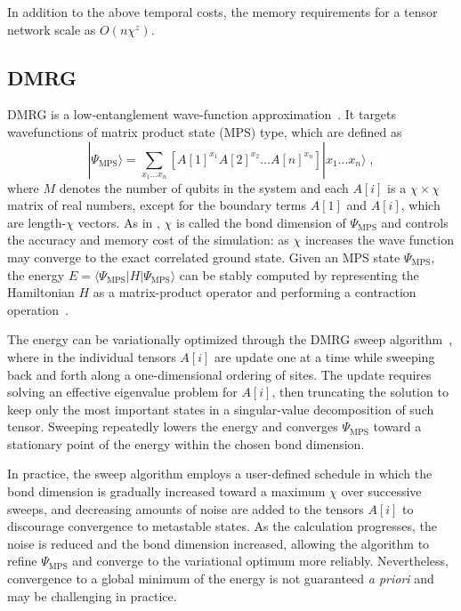 \documentclass[
  reprint,            %
  amsmath,amssymb,
  aps,
  superscriptaddress, %
  longbibliography
]{revtex4-2}
\theoremstyle{definition}
\begin{document}
In addition to the above temporal costs, the memory requirements for a tensor network scale as $O(n \chi^z)$.



\subsection{DMRG}
\label{sapp:dmrg}

DMRG is a low-entanglement wave-function approximation~\cite{white1992dmrg}. It targets wavefunctions of matrix product state (MPS) type, which are defined as
\begin{equation}
| \Psi_{\mathrm{MPS}} \rangle = \sum_{x_1 \dots x_n}  \left[ A[1]^{x_1} A[2]^{x_2} \dots A[n]^{x_n} \right] | x_1 \dots x_n \rangle
\;,
\end{equation} 
where $M$ denotes the number of qubits in the system and each $A[i]$ is a $\chi\times\chi$ matrix of real numbers, except for the boundary terms $A[1]$ and $A[i]$, which are length-$\chi$ vectors.
As in , $\chi$ is called the bond dimension of $\Psi_{\mathrm{MPS}}$ and controls the accuracy and memory cost of the simulation: as $\chi$ increases the wave function may converge to the exact correlated ground state.
Given an MPS state $\Psi_{\mathrm{MPS}}$, the energy $E=\langle \Psi_{\mathrm{MPS}} | H | \Psi_{\mathrm{MPS}} \rangle$ can be stably computed by representing the Hamiltonian $H$ as a matrix-product operator and performing a contraction operation~\cite{schollwock2011density}.

The energy can be variationally optimized through the DMRG sweep algorithm~\cite{white1993density}, where in the individual tensors $A[i]$ are update one at a time while sweeping back and forth along a one-dimensional ordering of sites.
The update requires solving an effective eigenvalue problem for $A[i]$, then truncating the solution to keep only the most important states in a singular-value decomposition of such tensor.
Sweeping repeatedly lowers the energy and converges $\Psi_{\mathrm{MPS}}$ toward a stationary point of the energy within the chosen bond dimension.

In practice, the sweep algorithm employs a user-defined schedule in which the bond dimension is gradually increased toward a maximum $\chi$ over successive sweeps, and decreasing amounts of noise are added to the tensors $A[i]$ to discourage convergence to metastable states.
As the calculation progresses, the noise is reduced and the bond dimension increased, allowing the algorithm to refine $\Psi_{\mathrm{MPS}}$ and converge to the variational optimum more reliably. Nevertheless, convergence to a global minimum of the energy is not guaranteed \emph{a priori} and may be challenging in practice.
\end{document}
